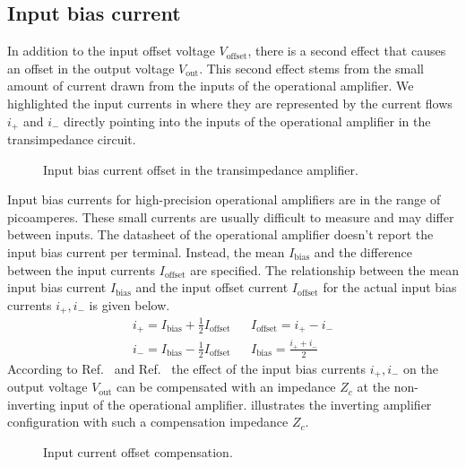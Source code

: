 \subsection{Input bias current}

In addition to the input offset voltage $V_\text{offset}$, there is a second effect that causes an offset in the output voltage $V_\text{out}$.
This second effect stems from the small amount of current drawn from the inputs of the operational amplifier.
We highlighted the input currents in  where they are represented by the current flows $i_+$ and $i_-$ directly pointing into the inputs of the operational amplifier in the transimpedance circuit.
\begin{figure}[H]
	\centering
	
	\caption{Input bias current offset in the transimpedance amplifier.}\label{fig:input_bias_current}
\end{figure}
Input bias currents for high-precision operational amplifiers are in the range of picoamperes.
These small currents are usually difficult to measure and may differ between inputs.
The datasheet of the operational amplifier doesn't report the input bias current per terminal. Instead, the mean $I_\text{bias}$ and the difference between the input currents $I_\text{offset}$ are specified.
The relationship between the mean input bias current $I_\text{bias}$ and the input offset current $I_\text{offset}$ for the actual input bias currents $i_+,i_-$ is given below.
\begin{align}
	i_+=I_\text{bias}+\frac{1}{2}I_\text{offset} &&
	I_\text{offset}=i_+-i_- \\
	i_-=I_\text{bias}-\frac{1}{2}I_\text{offset} &&
	I_\text{bias}=\frac{i_++i_-}{2}
\end{align}
According to Ref.~\cite[p.~57]{Jung05} and Ref.~\cite[p.~25]{Graeme96} the effect of the input bias currents $i_+,i_-$ on the output voltage $V_\text{out}$ can be compensated with an impedance $Z_c$ at the non-inverting input of the operational amplifier.
 illustrates the inverting amplifier configuration with such a compensation impedance $Z_c$.
\begin{figure}[H]
	\centering
	
	\caption{Input current offset compensation.}\label{fig:input_bias_current_compensation}
\end{figure}
